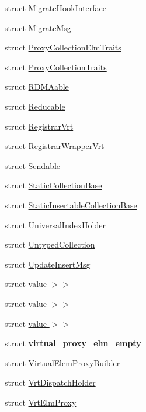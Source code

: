 \begin{DoxyCompactItemize}
struct \hyperlink{structvt_1_1vrt_1_1collection_1_1_migrate_hook_interface}{Migrate\+Hook\+Interface}
\item 
struct \hyperlink{structvt_1_1vrt_1_1collection_1_1_migrate_msg}{Migrate\+Msg}
\item 
struct \hyperlink{structvt_1_1vrt_1_1collection_1_1_proxy_collection_elm_traits}{Proxy\+Collection\+Elm\+Traits}
\item 
struct \hyperlink{structvt_1_1vrt_1_1collection_1_1_proxy_collection_traits}{Proxy\+Collection\+Traits}
\item 
struct \hyperlink{structvt_1_1vrt_1_1collection_1_1_r_d_m_aable}{R\+D\+M\+Aable}
\item 
struct \hyperlink{structvt_1_1vrt_1_1collection_1_1_reducable}{Reducable}
\item 
struct \hyperlink{structvt_1_1vrt_1_1collection_1_1_registrar_vrt}{Registrar\+Vrt}
\item 
struct \hyperlink{structvt_1_1vrt_1_1collection_1_1_registrar_wrapper_vrt}{Registrar\+Wrapper\+Vrt}
\item 
struct \hyperlink{structvt_1_1vrt_1_1collection_1_1_sendable}{Sendable}
\item 
struct \hyperlink{structvt_1_1vrt_1_1collection_1_1_static_collection_base}{Static\+Collection\+Base}
\item 
struct \hyperlink{structvt_1_1vrt_1_1collection_1_1_static_insertable_collection_base}{Static\+Insertable\+Collection\+Base}
\item 
struct \hyperlink{structvt_1_1vrt_1_1collection_1_1_universal_index_holder}{Universal\+Index\+Holder}
\item 
struct \hyperlink{structvt_1_1vrt_1_1collection_1_1_untyped_collection}{Untyped\+Collection}
\item 
struct \hyperlink{structvt_1_1vrt_1_1collection_1_1_update_insert_msg}{Update\+Insert\+Msg}
\item 
struct \hyperlink{structvt_1_1vrt_1_1collection_1_1_default_map_3_01_collection_t_00_01typename_01std_1_1enable__ib7e55b659c64f165e6a671fb7294e371}{value $>$$>$}
\item 
struct \hyperlink{structvt_1_1vrt_1_1collection_1_1_default_map_3_01_collection_t_00_01typename_01std_1_1enable__id31d055881d6867942086ee5834ad7b4}{value $>$$>$}
\item 
struct \hyperlink{structvt_1_1vrt_1_1collection_1_1_default_map_3_01_collection_t_00_01typename_01std_1_1enable__i0c13cd14d7af17b34311bb8ce93d9804}{value $>$$>$}
\item 
struct {\bfseries virtual\+\_\+proxy\+\_\+elm\+\_\+empty}
\item 
struct \hyperlink{structvt_1_1vrt_1_1collection_1_1_virtual_elem_proxy_builder}{Virtual\+Elem\+Proxy\+Builder}
\item 
struct \hyperlink{structvt_1_1vrt_1_1collection_1_1_vrt_dispatch_holder}{Vrt\+Dispatch\+Holder}
\item 
struct \hyperlink{structvt_1_1vrt_1_1collection_1_1_vrt_elm_proxy}{Vrt\+Elm\+Proxy}
\end{DoxyCompactItemize}
